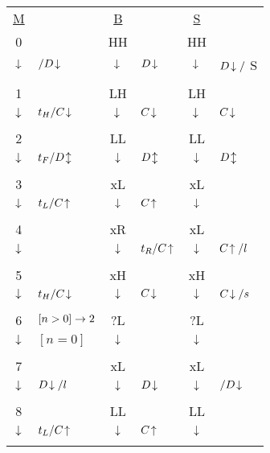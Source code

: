 \documentclass{article}
\begin{document}

\begin{centering}
\begin{tabular}{c@{}p{2.5cm} c@{}p{2cm} c@{}p{2cm} }
  \underline{M} & & \underline{B} & & \underline{S} & \\ 

  0  & & HH & & HH & \\
  $\downarrow$ & $/D\!\downarrow$ & $\!\downarrow$ & $D\!\downarrow$ & $\!\downarrow$ & $D\!\downarrow/$ S\\
  \\

  1 &  & LH & & LH & \\
  $\downarrow$ & $t_H/C\!\downarrow $ & $\!\downarrow$ & $C\!\downarrow$ & $\!\downarrow$ & $C\!\downarrow$ \\
  \\

  2 &  & LL & & LL & \\
  $\downarrow$ & $t_F/D\!\updownarrow $ & $\downarrow$ & $D\!\updownarrow$ & $\downarrow$ & $D\!\updownarrow$ \\
  \\

  3 & & xL  & & xL & \\
  $\downarrow$ & $t_L/C\!\uparrow $ & $\downarrow$ & $C\!\uparrow$  & $\downarrow$ &  \\
  \\

  4 & & xR  & & xL & \\
  $\downarrow$ & & $\downarrow$ & $t_R/C\!\uparrow$ & $\downarrow$ &  $C\!\uparrow/l$ \\
  \\

  5 &  & xH & & xH & \\
  $\downarrow$ & $t_H/C\!\downarrow $ & $\downarrow$ & $C\!\downarrow$  & $\downarrow$ & $C\!\downarrow/s$ \\
  \\

  6 & \hfil $[n>0] \rightarrow 2$  & ?L & & ?L & \\
  $\downarrow$ & $[n=0]$ & $\downarrow$ &  & $\downarrow$ & \\
  \\

  7 &  & xL & & xL & \\
  $\downarrow$ & $D\!\downarrow/l$ & $\downarrow$ & $D\!\downarrow$ & $\downarrow$ & $/ D\!\downarrow$ \\
  \\

  
  8 &  & LL & & LL & \\
  $\downarrow$ & $t_L/C\!\uparrow$ & $\downarrow$ & $C\!\uparrow$ & $\downarrow$ &   \\
  \\


\end{tabular}
\end{centering}
\end{document}
